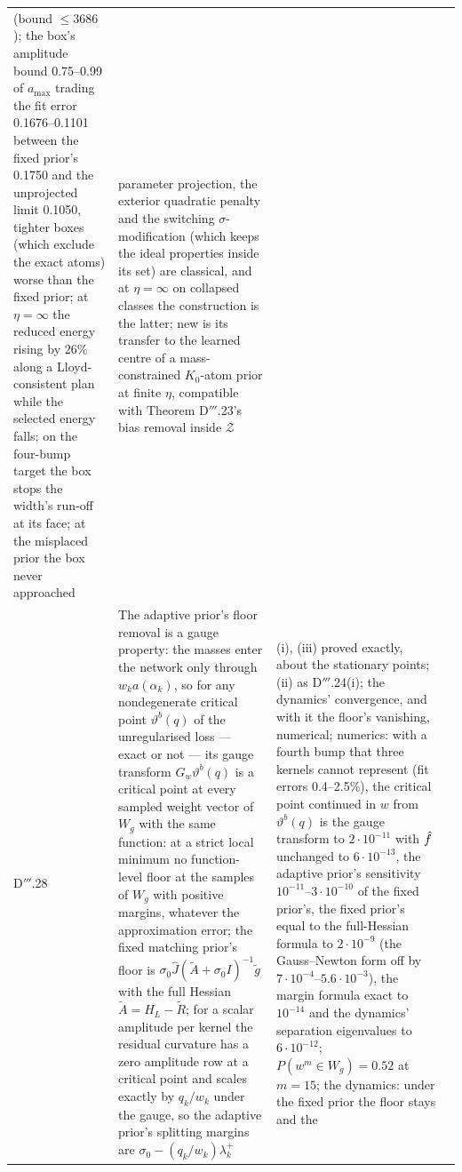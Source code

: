 {\begin{longtable}{@{}>{\raggedright\arraybackslash}p{}>{\raggedright\arraybackslash}p{}%
>{\raggedright\arraybackslash}p{}>{\raggedright\arraybackslash}p{}@{}}
(bound $\le3686$); the box's amplitude bound 0.75--0.99 of $a_{\max}$ trading the fit error 0.1676--0.1101 between
the fixed prior's 0.1750 and the unprojected limit 0.1050, tighter boxes (which exclude the exact atoms) worse than
the fixed prior; at $\eta = \infty$ the reduced energy rising by 26\% along a Lloyd-consistent plan while the selected
energy falls; on the four-bump target the box stops the width's run-off at its face; at the misplaced prior the box
never approached
& parameter projection, the exterior quadratic penalty and the switching $\sigma$-modification (which keeps the ideal
properties inside its set) are classical, and at $\eta = \infty$ on collapsed classes the construction is the latter;
new is its transfer to the learned centre of a mass-constrained $K_0$-atom prior at finite $\eta$, compatible with
Theorem D$'''$.23's bias removal inside $\mathcal{Z}$\\
\addlinespace[0.5pt]
D$'''$.28 & The adaptive prior's floor removal is a gauge property: the masses enter the network only through
$w_ka(\alpha_k)$, so for any nondegenerate critical point $\vartheta^b(q)$ of the unregularised loss --- exact or not
--- its gauge transform $G_w\vartheta^b(q)$ is a critical point at every sampled weight vector of $W_g$ with the same
function: at a strict local minimum no function-level floor at the samples of $W_g$ with positive margins, whatever
the approximation error; the fixed matching prior's floor is $\sigma_0\hat J(\tilde A + \sigma_0I)^{-1}\tilde g$ with
the full Hessian $\tilde A = H_L - \tilde R$; for a scalar amplitude per kernel the residual curvature has a zero
amplitude row at a critical point and scales exactly by $q_k/w_k$ under the gauge, so the adaptive prior's splitting
margins are $\sigma_0 - (q_k/w_k)\lambda^+_k$
& (i), (iii) proved exactly, about the stationary points; (ii) as D$'''$.24(i); the dynamics' convergence, and with
it the floor's vanishing, numerical; numerics: with a fourth bump that three kernels cannot represent (fit errors
0.4--2.5\%), the critical point continued in $w$ from $\vartheta^b(q)$ is the gauge transform to $2\cdot10^{-11}$ with
$\hat f$ unchanged to $6\cdot10^{-13}$, the adaptive prior's sensitivity $10^{-11}$--$3\cdot10^{-10}$ of the fixed
prior's, the fixed prior's equal to the full-Hessian formula to $2\cdot10^{-9}$ (the Gauss--Newton form off by
$7\cdot10^{-4}$--$5.6\cdot10^{-3}$), the margin formula exact to $10^{-14}$ and the dynamics' separation eigenvalues
to $6\cdot10^{-12}$; $P(w^m\in W_g) = 0.52$ at $m = 15$; the dynamics: under the fixed prior the floor stays and the

\end{longtable}}
